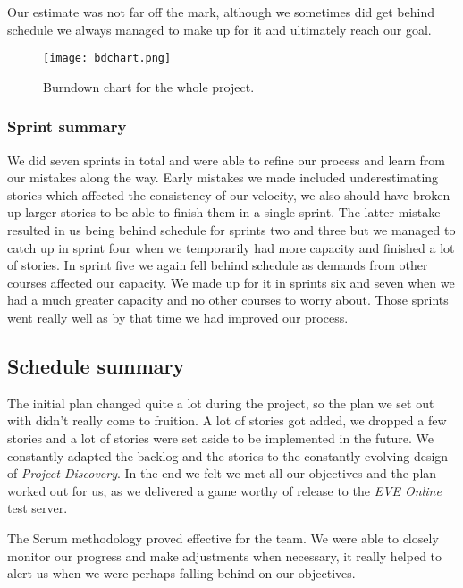     Our estimate was not far off the mark, although we sometimes did get behind schedule we always managed to make up for it and ultimately reach our goal. 
		
		\begin{figure}[H]
		  \centering
		  \graphicspath{ {./graphics/} }
		  \centerline{\texttt{[image: bdchart.png]}}
		  \caption{\label{fig:bdchart} Burndown chart for the whole project.}
		\end{figure}

	\subsubsection{Sprint summary}
  We did seven sprints in total and were able to refine our process and learn from our mistakes along the way. Early mistakes we made included underestimating stories which affected the consistency of our velocity, we also should have broken up larger stories to be able to finish them in a single sprint. The latter mistake resulted in us being behind schedule for sprints two and three but we managed to catch up in sprint four when we temporarily had more capacity and finished a lot of stories. In sprint five we again fell behind schedule as demands from other courses affected our capacity. We made up for it in sprints six and seven when we had a much greater capacity and no other courses to worry about. Those sprints went really well as by that time we had improved our process. 

\subsection{Schedule summary}
The initial plan changed quite a lot during the project, so the plan we set out with didn't really come to fruition. A lot of stories got added, we dropped a few stories and a lot of stories were set aside to be implemented in the future. We constantly adapted the backlog and the stories to the constantly evolving design of \emph{Project Discovery}. In the end we felt we met all our objectives and the plan worked out for us, as we delivered a game worthy of release to the \emph{EVE Online} test server. 

The Scrum methodology proved effective for the team. We were able to closely monitor our progress and make adjustments when necessary, it really helped to alert us when we were perhaps falling behind on our objectives.